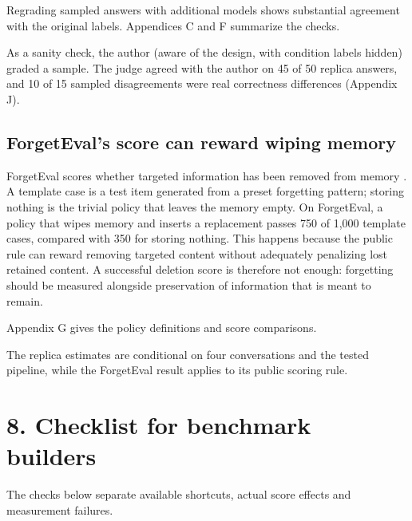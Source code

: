 \documentclass[11pt]{article}
\begin{document}
Regrading sampled answers with additional models shows substantial agreement with the original labels. Appendices C and F summarize the checks.

As a sanity check, the author (aware of the design, with condition labels hidden) graded a sample. The judge agreed with the author on 45 of 50 replica answers, and 10 of 15 sampled disagreements were real correctness differences (Appendix J).

\subsection{ForgetEval's score can reward wiping memory}\label{forgetevals-score-can-reward-wiping-memory}

ForgetEval scores whether targeted information has been removed from memory \citep{Yang2026ForgetEval}. A template case is a test item generated from a preset forgetting pattern; storing nothing is the trivial policy that leaves the memory empty. On ForgetEval, a policy that wipes memory and inserts a replacement passes 750 of 1,000 template cases, compared with 350 for storing nothing. This happens because the public rule can reward removing targeted content without adequately penalizing lost retained content. A successful deletion score is therefore not enough: forgetting should be measured alongside preservation of information that is meant to remain.

Appendix G gives the policy definitions and score comparisons.

The replica estimates are conditional on four conversations and the tested pipeline, while the ForgetEval result applies to its public scoring rule.

\label{main-8}

\section{8. Checklist for benchmark builders}\label{checklist-for-benchmark-builders}

The checks below separate available shortcuts, actual score effects and measurement failures.
\end{document}
